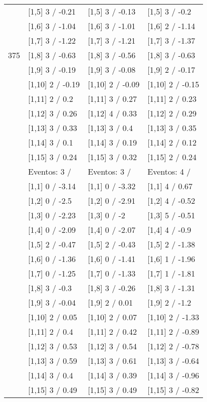\begin{table}
\begin{tabular}[t]{llll}
 & {}[1,5] 3  / -0.21 & {}[1,5] 3  / -0.13 & {}[1,5] 3  / -0.2\\
 & {}[1,6] 3  / -1.04 & {}[1,6] 3  / -1.01 & {}[1,6] 2  / -1.14\\
 & {}[1,7] 3  / -1.22 & {}[1,7] 3  / -1.21 & {}[1,7] 3  / -1.37\\
375 & {}[1,8] 3  / -0.63 & {}[1,8] 3  / -0.56 & {}[1,8] 3  / -0.63\\
\addlinespace
 & {}[1,9] 3  / -0.19 & {}[1,9] 3  / -0.08 & {}[1,9] 2  / -0.17\\
 & {}[1,10] 2  / -0.19 & {}[1,10] 2  / -0.09 & {}[1,10] 2  / -0.15\\
 & {}[1,11] 2  / 0.2 & {}[1,11] 3  / 0.27 & {}[1,11] 2  / 0.23\\
 & {}[1,12] 3  / 0.26 & {}[1,12] 4  / 0.33 & {}[1,12] 2  / 0.29\\
 & {}[1,13] 3  / 0.33 & {}[1,13] 3  / 0.4 & {}[1,13] 3  / 0.35\\
\addlinespace
 & {}[1,14] 3  / 0.1 & {}[1,14] 3  / 0.19 & {}[1,14] 2  / 0.12\\
 & {}[1,15] 3  / 0.24 & {}[1,15] 3  / 0.32 & {}[1,15] 2  / 0.24\\
 & Eventos:  3 / & Eventos:  3 / & Eventos:  4 /\\
 & {}[1,1] 0  / -3.14 & {}[1,1] 0  / -3.32 & {}[1,1] 4  / 0.67\\
 & {}[1,2] 0  / -2.5 & {}[1,2] 0  / -2.91 & {}[1,2] 4  / -0.52\\
\addlinespace
 & {}[1,3] 0  / -2.23 & {}[1,3] 0  / -2 & {}[1,3] 5  / -0.51\\
 & {}[1,4] 0  / -2.09 & {}[1,4] 0  / -2.07 & {}[1,4] 4  / -0.9\\
 & {}[1,5] 2  / -0.47 & {}[1,5] 2  / -0.43 & {}[1,5] 2  / -1.38\\
 & {}[1,6] 0  / -1.36 & {}[1,6] 0  / -1.41 & {}[1,6] 1  / -1.96\\
 & {}[1,7] 0  / -1.25 & {}[1,7] 0  / -1.33 & {}[1,7] 1  / -1.81\\
\addlinespace
500 & {}[1,8] 3  / -0.3 & {}[1,8] 3  / -0.26 & {}[1,8] 3  / -1.31\\
 & {}[1,9] 3  / -0.04 & {}[1,9] 2  / 0.01 & {}[1,9] 2  / -1.2\\
 & {}[1,10] 2  / 0.05 & {}[1,10] 2  / 0.07 & {}[1,10] 2  / -1.33\\
 & {}[1,11] 2  / 0.4 & {}[1,11] 2  / 0.42 & {}[1,11] 2  / -0.89\\
 & {}[1,12] 3  / 0.53 & {}[1,12] 3  / 0.54 & {}[1,12] 2  / -0.78\\
\addlinespace
 & {}[1,13] 3  / 0.59 & {}[1,13] 3  / 0.61 & {}[1,13] 3  / -0.64\\
 & {}[1,14] 3  / 0.4 & {}[1,14] 3  / 0.39 & {}[1,14] 3  / -0.96\\
 & {}[1,15] 3  / 0.49 & {}[1,15] 3  / 0.49 & {}[1,15] 3  / -0.82\\
\bottomrule
\end{tabular}
\end{table}
